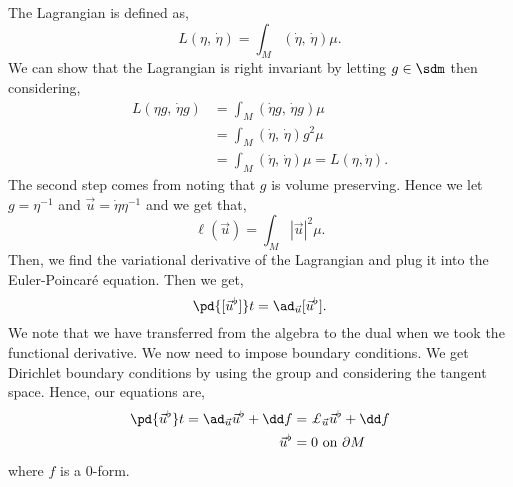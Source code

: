\noindent
The Lagrangian is defined as,
$$ L(\eta,\, \dot \eta) = \int_M (\dot \eta,\, \dot \eta)\mu. $$
We can show that the Lagrangian is right invariant by letting $g \in \sdm$ then considering,
\begin{align*}
  L(\eta g,\, \dot \eta g) &= \int_M (\dot \eta g,\, \dot \eta g)\mu \\
  &= \int_M (\dot \eta,\, \dot \eta) g^2 \mu \\
  &= \int_M (\dot\eta,\, \dot\eta)\mu = L(\eta, \dot \eta).
\end{align*}
The second step comes from noting that $g$ is volume preserving. Hence we let $g = \eta^{-1}$ and $\vec u = \dot\eta \eta^{-1}$ and we get that,
$$ \ell(\vec u) = \int_M |\vec u|^2 \mu. $$
Then, we find the variational derivative of the Lagrangian and plug it into the Euler-Poincar\'e equation. Then we get,
$$ \pd {[\vec u^\flat]} t = \ad_{\vec u} [\vec u^\flat]. $$
We note that we have transferred from the algebra to the dual when we took the functional derivative. We now need to impose boundary conditions. We get Dirichlet boundary conditions by using the group and considering the tangent space. Hence, our equations are,
\begin{equation}
  \begin{split}
    \pd {\vec u^\flat} t = \ad_{\vec u} \vec u^\flat + \dd f &= \pounds_{\vec u} \vec u^\flat + \dd f \\
    \vec u^\flat &= 0 \text{ on }\partial M
  \end{split}
\end{equation}
where $f$ is a $0$-form.